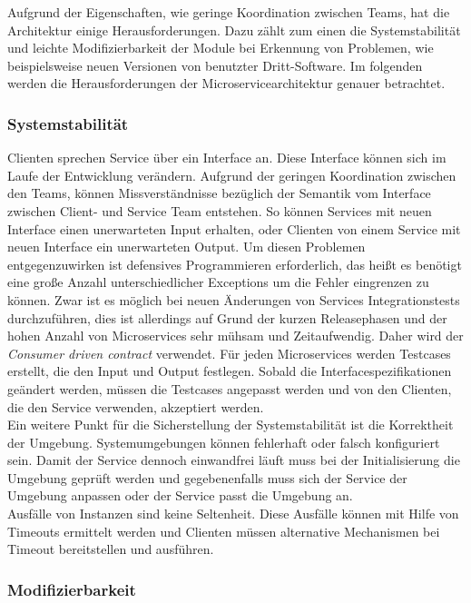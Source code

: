 Aufgrund der Eigenschaften, wie geringe Koordination zwischen Teams, hat die Architektur einige Herausforderungen. Dazu zählt zum einen die Systemstabilität und leichte Modifizierbarkeit der Module bei Erkennung von Problemen, wie beispielsweise neuen Versionen von benutzter Dritt-Software. Im folgenden werden die Herausforderungen der Microservicearchitektur genauer betrachtet.

\subsubsection{Systemstabilität}

Clienten sprechen Service über ein Interface an. Diese Interface können sich im Laufe der Entwicklung verändern. Aufgrund der geringen Koordination zwischen den Teams, können Missverständnisse bezüglich der Semantik vom Interface zwischen Client- und Service Team entstehen. So können Services mit neuen Interface einen unerwarteten Input erhalten, oder Clienten von einem Service mit neuen Interface ein unerwarteten Output. Um diesen Problemen entgegenzuwirken ist defensives Programmieren erforderlich, das heißt es benötigt eine große Anzahl unterschiedlicher Exceptions um die Fehler eingrenzen zu können. Zwar ist es möglich bei neuen Änderungen von Services Integrationstests durchzuführen, dies ist allerdings auf Grund der kurzen Releasephasen und der hohen Anzahl von Microservices sehr mühsam und Zeitaufwendig. Daher wird der \textit{Consumer driven contract} verwendet. Für jeden Microservices werden Testcases erstellt, die den Input und Output festlegen. Sobald die Interfacespezifikationen geändert werden, müssen die Testcases angepasst werden und von den Clienten, die den Service verwenden, akzeptiert werden. \\
Ein weitere Punkt für die Sicherstellung der Systemstabilität ist die Korrektheit der Umgebung. Systemumgebungen können fehlerhaft oder falsch konfiguriert sein. Damit der Service dennoch einwandfrei läuft muss bei der Initialisierung die Umgebung geprüft werden und gegebenenfalls muss sich der Service der Umgebung anpassen oder der Service passt die Umgebung an.\\
Ausfälle von Instanzen sind keine Seltenheit. Diese Ausfälle können mit Hilfe von Timeouts ermittelt werden und Clienten müssen alternative Mechanismen bei Timeout bereitstellen und ausführen. 

\subsubsection{Modifizierbarkeit}

